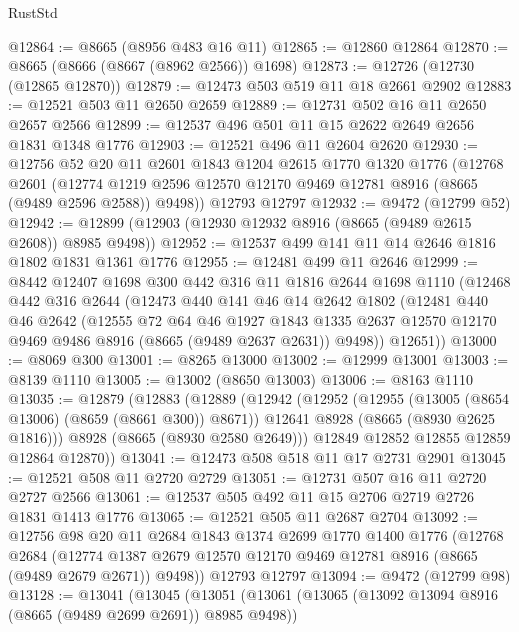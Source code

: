 \begin{lexlean}{RustStd}
\begin{coremodule}
@12864 := @8665 (@8956 @483 @16 @11)
@12865 := @12860 @12864
@12870 := @8665 (@8666 (@8667 (@8962 @2566)) @1698)
@12873 := @12726 (@12730 (@12865 @12870))
@12879 := @12473 @503 @519 @11 @18 @2661 @2902
@12883 := @12521 @503 @11 @2650 @2659
@12889 := @12731 @502 @16 @11 @2650 @2657 @2566
@12899 := @12537 @496 @501 @11 @15 @2622 @2649 @2656 @1831 @1348 @1776
@12903 := @12521 @496 @11 @2604 @2620
@12930 := @12756
    @52
    @20
    @11
    @2601
    @1843
    @1204
    @2615
    @1770
    @1320
    @1776
    (@12768
      @2601
      (@12774 @1219 @2596 @12570 @12170 @9469 @12781 @8916 (@8665 (@9489 @2596 @2588)) @9498))
    @12793
    @12797
@12932 := @9472 (@12799 @52)
@12942 := @12899 (@12903 (@12930 @12932 @8916 (@8665 (@9489 @2615 @2608)) @8985 @9498))
@12952 := @12537 @499 @141 @11 @14 @2646 @1816 @1802 @1831 @1361 @1776
@12955 := @12481 @499 @11 @2646
@12999 := @8442
    @12407
    @1698
    @300
    @442
    @316
    @11
    @1816
    @2644
    @1698
    @1110
    (@12468
      @442
      @316
      @2644
      (@12473
        @440
        @141
        @46
        @14
        @2642
        @1802
        (@12481
          @440
          @46
          @2642
          (@12555
            @72
            @64
            @46
            @1927
            @1843
            @1335
            @2637
            @12570
            @12170
            @9469
            @9486
            @8916
            (@8665 (@9489 @2637 @2631))
            @9498))
        @12651))
@13000 := @8069 @300
@13001 := @8265 @13000
@13002 := @12999 @13001
@13003 := @8139 @1110
@13005 := @13002 (@8650 @13003)
@13006 := @8163 @1110
@13035 := @12879
    (@12883
      (@12889
        (@12942
          (@12952
            (@12955 (@13005 (@8654 @13006) (@8659 (@8661 @300)) @8671))
            @12641
            @8928
            (@8665 (@8930 @2625 @1816)))
          @8928
          (@8665 (@8930 @2580 @2649)))
        @12849
        @12852
        @12855
        @12859
        @12864
        @12870))
@13041 := @12473 @508 @518 @11 @17 @2731 @2901
@13045 := @12521 @508 @11 @2720 @2729
@13051 := @12731 @507 @16 @11 @2720 @2727 @2566
@13061 := @12537 @505 @492 @11 @15 @2706 @2719 @2726 @1831 @1413 @1776
@13065 := @12521 @505 @11 @2687 @2704
@13092 := @12756
    @98
    @20
    @11
    @2684
    @1843
    @1374
    @2699
    @1770
    @1400
    @1776
    (@12768
      @2684
      (@12774 @1387 @2679 @12570 @12170 @9469 @12781 @8916 (@8665 (@9489 @2679 @2671)) @9498))
    @12793
    @12797
@13094 := @9472 (@12799 @98)
@13128 := @13041
    (@13045
      (@13051
        (@13061
          (@13065 (@13092 @13094 @8916 (@8665 (@9489 @2699 @2691)) @8985 @9498))

\end{coremodule}
\end{lexlean}
